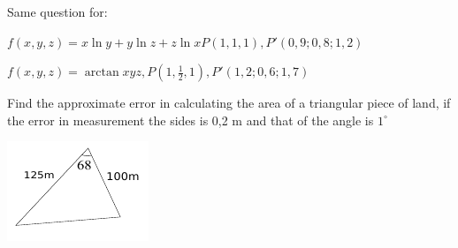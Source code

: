 \documentclass[11pt]{amsbook}
\begin{document}
\begin{hEnumerateArabic}
        \item{Same question for:}
            \begin{hEnumerateAlpha}
                \item $f(x, y, z) = x \ln{y} + y \ln{z} + z \ln{x} P(1,1,1), P'(0,9; 0,8; 1,2)$
                \item $f(x, y, z) = \arctan{xyz}, P(1,\frac{1}{2},1), P'(1,2; 0,6; 1,7)$
            \end{hEnumerateAlpha}
        \begin{minipage}{0.75\textwidth}
            \item        
                {Find the approximate error in calculating the area of a triangular piece of land, if the error in measurement the sides is 0,2 m and that of the angle is $1^{\circ}$}
        \end{minipage}
        \begin{minipage}{0.25\textwidth}
            \includegraphics{images/hw2.pdf}
        \end{minipage}        
    \end{hEnumerateArabic}
\end{document}
